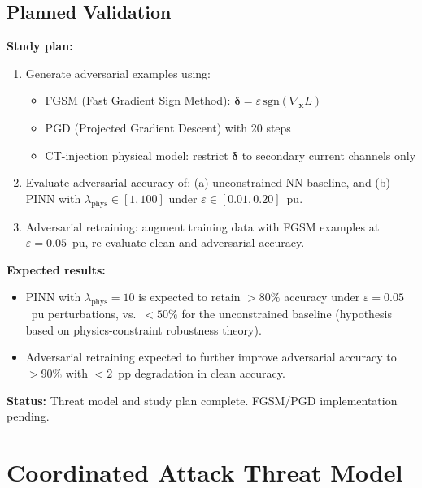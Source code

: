 \subsection{Planned Validation}
\label{sec:ch12_adversarial_validation}

\begin{tcolorbox}[colback=orange!5,colframe=orange!60!black,
  fonttitle=\bfseries\small,
  title={C25 --- Adversarial PINN Robustness (Pending)},
  breakable]
\small
\textbf{Study plan:}
\begin{enumerate}
\item Generate adversarial examples using:
      \begin{itemize}
      \item FGSM (Fast Gradient Sign Method): $\bm{\delta} = \varepsilon\,\mathrm{sgn}(\nabla_\mathbf{x} L)$
      \item PGD (Projected Gradient Descent) with 20 steps
      \item CT-injection physical model: restrict $\bm{\delta}$ to
            secondary current channels only
      \end{itemize}
\item Evaluate adversarial accuracy of:
      (a) unconstrained NN baseline, and
      (b) PINN with $\lambda_\mathrm{phys} \in [1, 100]$
      under $\varepsilon \in [0.01, 0.20]$~pu.
\item Adversarial retraining: augment training data with FGSM examples
      at $\varepsilon = 0.05$~pu, re-evaluate clean and adversarial accuracy.
\end{enumerate}

\textbf{Expected results:}
\begin{itemize}
\item PINN with $\lambda_\mathrm{phys} = 10$ is expected to retain $> 80\%$
      accuracy under $\varepsilon = 0.05$~pu perturbations, vs.\ $< 50\%$
      for the unconstrained baseline (hypothesis based on physics-constraint
      robustness theory).
\item Adversarial retraining expected to further improve adversarial
      accuracy to $> 90\%$ with $< 2$~pp degradation in clean accuracy.
\end{itemize}

\textbf{Status:} Threat model and study plan complete.
FGSM/PGD implementation pending.
\end{tcolorbox}

\section{Coordinated Attack Threat Model}
\label{sec:ch12_coordinated}

